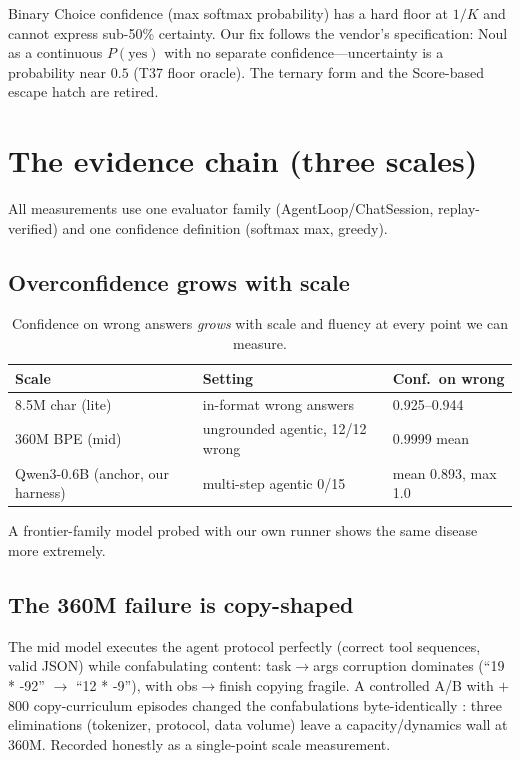 \documentclass[11pt]{article}
\begin{document}
Binary Choice confidence (max softmax probability) has a hard floor at
$1/K$ and cannot express sub-50\% certainty. Our fix follows the
vendor's specification: Noul as a continuous $P(\text{yes})$ with no
separate confidence---uncertainty is a probability near $0.5$ (T37 floor
oracle). The ternary form and the Score-based escape hatch are retired.

\section{The evidence chain (three scales)}
\label{sec:evidence}

All measurements use one evaluator family (AgentLoop/ChatSession,
replay-verified) and one confidence definition (softmax max, greedy).

\subsection{Overconfidence grows with scale}
\label{sec:scale}

\begin{table}[h]
\centering\small
\begin{tabular}{@{}lll@{}}
\toprule
Scale & Setting & Conf.\ on wrong \\
\midrule
8.5M char (lite) & in-format wrong answers & 0.925--0.944 \\
360M BPE (mid) & ungrounded agentic, 12/12 wrong & 0.9999 mean \\
Qwen3-0.6B (anchor, our harness) & multi-step agentic 0/15 & mean 0.893, max 1.0 \\
\bottomrule
\end{tabular}
\caption{Confidence on wrong answers \emph{grows} with scale and
fluency at every point we can measure.}
\label{tab:scale}
\end{table}

A frontier-family model probed with our own runner shows the same
disease more extremely.

\subsection{The 360M failure is copy-shaped}

The mid model executes the agent protocol perfectly (correct tool
sequences, valid JSON) while confabulating content: task$\to$args
corruption dominates (``19 * -92'' $\to$ ``12 * -9''), with
obs$\to$finish copying fragile. A controlled A/B with $+$800
copy-curriculum episodes changed the confabulations byte-identically
\citep{helioscopy}: three eliminations (tokenizer, protocol, data
volume) leave a capacity/dynamics wall at 360M. Recorded honestly as a
single-point scale measurement.
\end{document}
